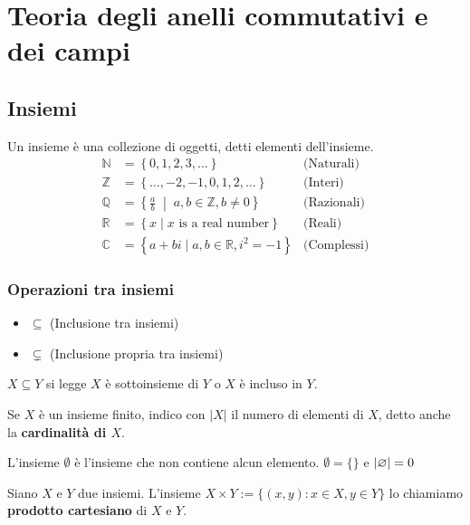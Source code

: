 \documentclass[../main.tex]{subfiles}
\begin{document}
\chapter{Teoria degli anelli commutativi e dei campi}
\section{Insiemi}
Un insieme è una collezione di oggetti, detti elementi dell'insieme.
\begin{align*}
    \mathbb{N} & = \left\{ 0,1,2,3,\ldots \right\}                                        & \text{(Naturali)}  \\[1ex]
    \mathbb{Z} & = \left\{ \ldots,-2,-1,0,1,2,\ldots \right\}                             & \text{(Interi)}    \\[1ex]
    \mathbb{Q} & = \left\{ \frac{a}{b} \;\middle|\; a,b \in \mathbb{Z}, b \neq 0 \right\} & \text{(Razionali)} \\[1ex]
    \mathbb{R} & = \left\{ x \mid x \text{ is a real number} \right\}                     & \text{(Reali)}     \\[1ex]
    \mathbb{C} & = \left\{ a + bi \mid a,b \in \mathbb{R}, i^2=-1 \right\}                & \text{(Complessi)}
\end{align*}

\subsection{Operazioni tra insiemi}
\begin{itemize}
    \item $\subseteq$  (Inclusione tra insiemi)
    \item $\subsetneq$ (Inclusione propria tra insiemi)
\end{itemize}

$X \subseteq Y$ si legge $X$ è sottoinsieme di $Y$ o $X$ è incluso in $Y$.

Se $X$ è un insieme finito, indico con $|X|$ il numero di elementi di $X$, detto anche la \textbf{cardinalità di $X$}.

\begin{definition}
    L'insieme $\emptyset$ è l'insieme che non contiene alcun elemento. $\emptyset = \{ \}$ e $\lvert\varnothing\rvert = 0$
\end{definition}

\begin{definition}
    Siano $X$ e $Y$ due insiemi. L'insieme $X \times Y := \{ (x,y) : x \in X , y \in Y \}$ lo chiamiamo \textbf{prodotto cartesiano} di $X$ e $Y$.
\end{definition}
\end{document}

